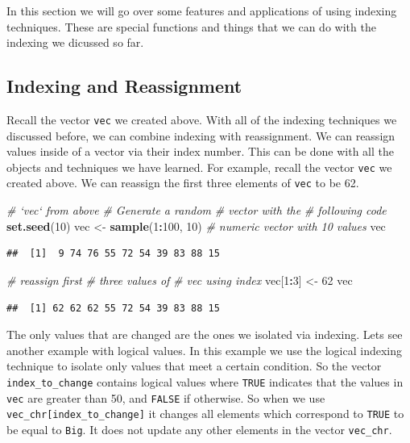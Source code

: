 \documentclass[
]{book}
\newenvironment{Shaded}{\begin{snugshade}}{\end{snugshade}}
\newcommand{\CommentTok}[1]{\textcolor[rgb]{0.56,0.35,0.01}{\textit{#1}}}
\newcommand{\DecValTok}[1]{\textcolor[rgb]{0.00,0.00,0.81}{#1}}
\newcommand{\KeywordTok}[1]{\textcolor[rgb]{0.13,0.29,0.53}{\textbf{#1}}}
\newcommand{\NormalTok}[1]{#1}
\newcommand{\OperatorTok}[1]{\textcolor[rgb]{0.81,0.36,0.00}{\textbf{#1}}}
\newcommand{\StringTok}[1]{\textcolor[rgb]{0.31,0.60,0.02}{#1}}
\begin{document}
In this section we will go over some features and applications of using indexing techniques. These are special functions and things that we can do with the indexing we dicussed so far.

\hypertarget{indexing-and-reassignment}{%
\subsection{Indexing and Reassignment}\label{indexing-and-reassignment}}

Recall the vector \texttt{vec} we created above. With all of the indexing techniques we discussed before, we can combine indexing with reassignment. We can reassign values inside of a vector via their index number. This can be done with all the objects and techniques we have learned. For example, recall the vector \texttt{vec} we created above. We can reassign the first three elements of \texttt{vec} to be 62.

\begin{Shaded}
\begin{Highlighting}[]
\CommentTok{# `vec` from above}
\CommentTok{# Generate a random}
\CommentTok{# vector with the}
\CommentTok{# following code}
\KeywordTok{set.seed}\NormalTok{(}\DecValTok{10}\NormalTok{)}
\NormalTok{vec <-}\StringTok{ }\KeywordTok{sample}\NormalTok{(}\DecValTok{1}\OperatorTok{:}\DecValTok{100}\NormalTok{,}
    \DecValTok{10}\NormalTok{)  }\CommentTok{# numeric vector with 10 values}
\NormalTok{vec}
\end{Highlighting}
\end{Shaded}

\begin{verbatim}
##  [1]  9 74 76 55 72 54 39 83 88 15
\end{verbatim}

\begin{Shaded}
\begin{Highlighting}[]
\CommentTok{# reassign first}
\CommentTok{# three values of}
\CommentTok{# vec using index}
\NormalTok{vec[}\DecValTok{1}\OperatorTok{:}\DecValTok{3}\NormalTok{] <-}\StringTok{ }\DecValTok{62}
\NormalTok{vec}
\end{Highlighting}
\end{Shaded}

\begin{verbatim}
##  [1] 62 62 62 55 72 54 39 83 88 15
\end{verbatim}

The only values that are changed are the ones we isolated via indexing. Lets see another example with logical values. In this example we use the logical indexing technique to isolate only values that meet a certain condition. So the vector \texttt{index\_to\_change} contains logical values where \texttt{TRUE} indicates that the values in \texttt{vec} are greater than 50, and \texttt{FALSE} if otherwise. So when we use \texttt{vec\_chr{[}index\_to\_change{]}} it changes all elements which correspond to \texttt{TRUE} to be equal to \texttt{Big}. It does not update any other elements in the vector \texttt{vec\_chr}.
\end{document}
